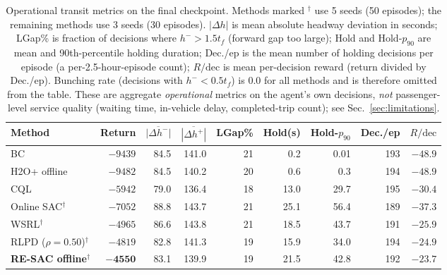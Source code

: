 \documentclass[journal,10pt]{IEEEtran}
\begin{document}
\begin{table}[!t]
\centering
\caption{Operational transit metrics on the final checkpoint. Methods marked $^\dagger$ use 5 seeds (50 episodes); the remaining methods use 3 seeds (30 episodes). $|\Delta h|$ is mean absolute headway deviation in seconds; LGap\% is fraction of decisions where $h^->1.5t_f$ (forward gap too large); Hold and Hold-$p_{90}$ are mean and 90th-percentile holding duration; Dec./ep is the mean number of holding decisions per episode (a per-2.5-hour-episode count); $R/\text{dec}$ is mean per-decision reward (return divided by Dec./ep). Bunching rate (decisions with $h^- < 0.5 t_f$) is $0.0$ for all methods and is therefore omitted from the table. These are aggregate \emph{operational} metrics on the agent's own decisions, \emph{not} passenger-level service quality (waiting time, in-vehicle delay, completed-trip count); see Sec.~\ref{sec:limitations}.}
\label{tab:operational}
\footnotesize
\setlength{\tabcolsep}{4pt}
\begin{tabular}{@{}lrrrrrrrr@{}}
\toprule
Method & Return & $\overline{|\Delta h^-|}$ & $\overline{|\Delta h^+|}$ & LGap\% & Hold(s) & Hold-$p_{90}$ & Dec./ep & $R/\text{dec}$ \\
\midrule
BC                       & $-9439$ & 84.5 & 141.0 & 21 & 0.2  & 0.01 & 193 & $-48.9$ \\
H2O+ offline             & $-9482$ & 84.5 & 140.2 & 20 & 0.6  & 0.3  & 194 & $-48.9$ \\
CQL                      & $-5942$ & 79.0 & 136.4 & 18 & 13.0 & 29.7 & 195 & $-30.4$ \\
Online SAC$^\dagger$     & $-7052$ & 88.8 & 143.7 & 21 & 25.1 & 56.4 & 189 & $-37.3$ \\
WSRL$^\dagger$           & $-4965$ & 86.6 & 143.8 & 21 & 18.5 & 43.7 & 191 & $-25.9$ \\
RLPD ($\rho{=}0.50$)$^\dagger$ & $-4819$ & 82.8 & 141.3 & 19 & 15.9 & 34.0 & 194 & $-24.9$ \\
\textbf{RE-SAC offline}$^\dagger$ & $\mathbf{-4550}$ & 83.1 & 139.9 & 19 & 21.5 & 42.8 & 192 & $\mathbf{-23.7}$ \\
\bottomrule
\end{tabular}
\end{table}
\end{document}
